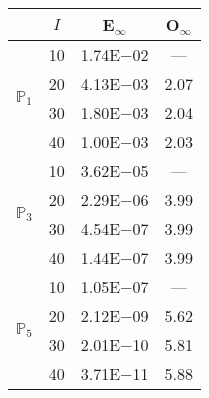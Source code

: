 \begin{table}[H]
\centering
\begin{tabular}{@{}l c c c@{}}
\toprule
 & $I$ & E$_{\infty}$ & O$_{\infty}$\\
\midrule
\multirow{4}{*}{$\mathbb{P}_{1}$}
 & 10 & 1.74E$-$02 & ---\\
 & 20 & 4.13E$-$03 & 2.07  \\
 & 30 & 1.80E$-$03 & 2.04  \\
 & 40 & 1.00E$-$03 & 2.03  \\
\midrule
\multirow{4}{*}{$\mathbb{P}_{3}$}
 & 10 & 3.62E$-$05 & ---\\
 & 20 & 2.29E$-$06 & 3.99  \\
 & 30 & 4.54E$-$07 & 3.99  \\
 & 40 & 1.44E$-$07 & 3.99  \\
\midrule
\multirow{4}{*}{$\mathbb{P}_{5}$}
 & 10 & 1.05E$-$07 & ---\\
 & 20 & 2.12E$-$09 & 5.62  \\
 & 30 & 2.01E$-$10 & 5.81  \\
 & 40 & 3.71E$-$11 & 5.88  \\
\bottomrule
\end{tabular}
\end{table}
